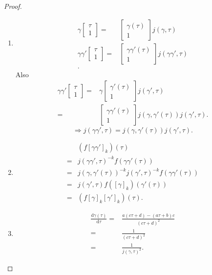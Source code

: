\begin{proof}
  \begin{enumerate}
    \item 
      \begin{align*}
	\gamma  \begin{bmatrix} \tau\\1 \end{bmatrix} =&\begin{bmatrix} \gamma(\tau)\\1 \end{bmatrix} j(\gamma,\tau)\\
	\gamma\gamma'\begin{bmatrix} \tau \\1 \end{bmatrix} =&\begin{bmatrix} \gamma\gamma'(\tau)\\
      1\end{bmatrix}j(\gamma\gamma',\tau)\\
      .\end{align*}
      Also
      \begin{align*}
	\gamma\gamma'\begin{bmatrix} \tau\\1 \end{bmatrix} =&\gamma\begin{bmatrix} \gamma'(\tau)\\1 \end{bmatrix} j(\gamma',\tau)\\
	=& \begin{bmatrix} \gamma\gamma'(\tau)\\1 \end{bmatrix} j(\gamma,\gamma'(\tau))j(\gamma',\tau)
      .\end{align*}
      \[
	\Rightarrow j(\gamma\gamma',\tau)=j(\gamma,\gamma'(\tau))j(\gamma',\tau).
      \] 
    \item 
      \begin{align*}
	&(f[\gamma\gamma']_k)(\tau)\\
	=& j(\gamma\gamma',\tau)^{-k}f(\gamma\gamma'(\tau))\\
	=& j(\gamma,\gamma'(\tau))^{-k}j(\gamma',\tau)^{-k}f(\gamma\gamma'(\tau))\\
	=& j(\gamma',\tau)f([\gamma]_k)(\gamma'(\tau))\\
	=&(f[\gamma]_k[\gamma']_k)(\tau)
      .\end{align*}
    \item 
      \begin{align*}
	\frac{\mathrm{d}\gamma(\tau)}{\mathrm{d}\tau}=& \frac{a(c\tau+d)-(a\tau+b)c}{(c\tau+d)^2}\\
	=& \frac{1}{(c\tau+d)^2}\\
	=& \frac{1}{j(\gamma,\tau)^2}
      .\end{align*}
  \end{enumerate}
\end{proof}
